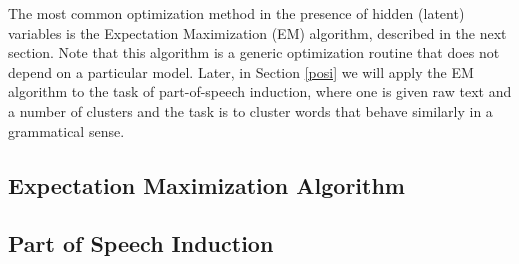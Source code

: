 The most common optimization method in the presence of hidden (latent) variables is the Expectation Maximization (EM) algorithm, described in the next section. Note that this algorithm is a generic optimization routine that does not depend on a particular model. Later, in Section \ref{posi} we will apply the EM algorithm to the task of part-of-speech induction, where one is given raw text and a number of clusters and the task is to cluster words that behave similarly in a grammatical sense. 

\subsection{\label{em}Expectation Maximization Algorithm}




\subsection{\label{posi}Part of Speech Induction}




